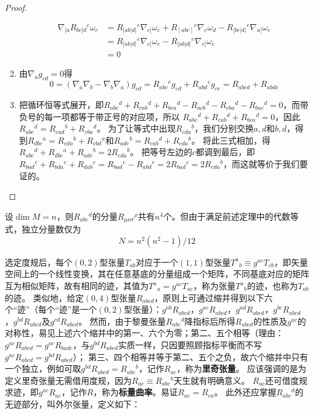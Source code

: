 \begin{proof}
\begin{enumerate}[（1）]
$$\begin{aligned}
\nabla_{[a}R_{bc]d}{}^e\omega_e & = R_{[ab|d|}{}^e\nabla_{c]}\omega_e + R_{[abc]}{}^e\nabla_e\omega_d - R_{[bc|d|}{}^e\nabla_{a]}\omega_e \\
& = R_{[ab|d|}{}^e\nabla_{c]}\omega_e - R_{[ab|d|}{}^e\nabla_{c]}\omega_e \\
& = 0
\end{aligned}$$
\item 由$\nabla_ag_{cd} = 0$得
$$0 = (\nabla_a\nabla_b - \nabla_b\nabla_a)g_{cd} = R_{abc}{}^eg_{ed} + R_{abd}{}^eg_{ce} = R_{abcd} + R_{abdc}$$
\item 把循环恒等式展开，即$R_{abc}{}^d + R_{cab}{}^d + R_{bca}{}^d - R_{acb}{}^d - R_{cba}{}^d - R_{bac}{}^d = 0$，而带负号的每一项都等于带正号的对应项，所以
$R_{abc}{}^d + R_{cab}{}^d + R_{bca}{}^d = 0$，因此$R_{abc}{}^d = R_{cad}{}^b + R_{cba}{}^d$。
为了让等式中出现$R_{cda}{}^b$，我们分别交换$a,d$和$b,d$，得到$R_{dbc}{}^a = R_{cda}{}^b + R_{cbd}{}^a$和$R_{adc}{}^b = R_{cab}{}^d + R_{cda}{}^b$。
将此三式相加，得$R_{abc}{}^d + R_{dbc}{}^a + R_{adc}{}^b = 2R_{cda}{}^b$。
把等号左边的$c$都调到最后，即$R_{bad}{}^c + R_{bda}{}^c + R_{dab}{}^c = R_{bad}{}^c - R_{abd}{}^c = 2R_{bad}{}^c = 2R_{cda}{}^b$，而这就等价于我们要证的。
\end{enumerate}
\end{proof}

\begin{note}
设$\dim M = n$，则$R_{abc}{}^d$的分量$R_{\mu\nu\sigma}{}^\rho$共有$n^4$个。但由于满足前述定理中的代数等式，独立分量数仅为
$$N = n^2(n^2 - 1) / 12$$
\end{note}

选定度规后，每个$(0, 2)$型张量$T_{ab}$对应于一个$(1, 1)$型张量$T^a{}_b \equiv g^{ac}T_{cb}$，即矢量空间上的一个线性变换，其在任意基底的分量组成一个矩阵，不同基底对应的矩阵互为相似矩阵，故有相同的迹，其值为$T^a{}_a = g^{ac}T_{ac}$，称为张量$T^a{}_b$的迹，也称为$T_{ab}$的迹。
类似地，给定$(0, 4)$型张量$R_{abcd}$，原则上可通过缩并得到以下六个``迹''（每个``迹''是一个$(0, 2)$型张量）：$g^{ab}R_{abcd}$，$g^{ac}R_{abcd}$，$g^{ad}R_{abcd}$，$g^{bc}R_{abcd}$，$g^{bd}R_{abcd}$及$g^{cd}R_{abcd}$。
然而，由于黎曼张量$R_{abc}{}^d$降指标后所得$R_{abcd}$的性质及$g^{ac}$的对称性，易见上述六个缩并中的第一、六个为零；第二、五个相等（理由：$g^{ac}R_{abcd} = g^{ac}R_{badc}$，与$g^{bd}R_{abcd}$实质一样，只因要照顾指标平衡而不写$g^{ac}R_{abcd} = g^{bd}R_{abcd}$）；
第三、四个相等并等于第二、五个之负，故六个缩并中只有一个独立，例如可取$g^{bd}R_{abcd} = R_{abc}{}^b$，记作$R_{ac}$，称为\textbf{里奇张量}。
应该强调的是为定义里奇张量无需借用度规，因为$R_{ac} \equiv R_{abc}{}^b$天生就有明确意义。
$R_{ac}$还可借度规求迹，即$g^{ac}R_{ac}$，记作$R$，称为\textbf{标量曲率}。易证$R_{ac} = R_{ca}$。
此外还应掌握$R_{abc}{}^d$的无迹部分，叫外尔张量，定义如下：

